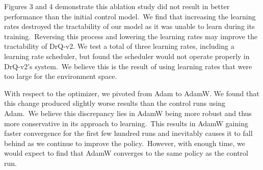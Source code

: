\documentclass[conference]{./IEEEtran/IEEEtran} %
\begin{document}
    \begin{figure}[!ht]
        \caption{}
    \end{figure}

    Figures 3 and 4 demonstrate this ablation study did not result in better performance than the initial control model.\ We find
    that increasing the learning rates destroyed the tractability of our model as it was unable to learn during its training.\
    Reversing this process and lowering the learning rates may improve the tractability of DrQ-v2. We test a total of three learning
    rates, including a learning rate scheduler, but found the scheduler would not operate properly in DrQ-v2's system.\ We
    believe this is the result of using learning rates that were too large for the environment space.\

    With respect to the optimizer, we pivoted from Adam to AdamW. We found that this change produced slightly worse results than
    the control runs using Adam.\ We believe this discrepancy lies in AdamW being more robust and thus more conservative in its
    approach to learning.\ This results in AdamW gaining faster convergence for the first few hundred runs and inevitably causes
    it to fall behind as we continue to improve the policy.\ However, with enough time, we would expect to find that AdamW converges
    to the same policy as the control run.\
\end{document}
